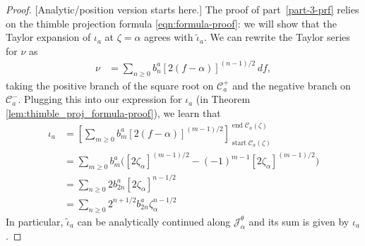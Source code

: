 \documentclass{article}
\newcommand{\series}[1]{\tilde{#1}}
\newcommand{\fracderiv}[3]{\partial^{#1}_{#2, #3}}
\newcommand{\laplace}{\mathcal{L}}
\theoremstyle{definition}
\theoremstyle{plain}
\newenvironment{todo}{\color{Coral}}{\color{black}}
\begin{document}
\begin{proof}
\begin{todo}[Analytic/position version starts here.]\end{todo} The proof of part~\ref{part-3-prf} relies on the thimble projection formula \eqref{eqn:formula-proof}: we will show that the Taylor expansion of $\iota_a$ at $\zeta=\alpha$ agrees with $\series{\iota}_a$. We can rewrite the Taylor series for $\nu$ as
\begin{align*}
\nu & = \sum_{n \ge 0} b_n^a [2(f - \alpha)]^{(n - 1)/2}\,df,
\end{align*}
taking the positive branch of the square root on $\mathcal{C}^+_a$ and the negative branch on $\mathcal{C}^-_a$. Plugging this into our expression for $\iota_a$ (in Theorem \ref{lem:thimble_proj_formula-proof}), we learn that
\begin{align*}
\iota_a & = \left[ \sum_{m \ge 0} b_m^a [2(f - \alpha)]^{(m - 1)/2} \right]_{\operatorname{start} \mathcal{C}_a(\zeta)}^{\operatorname{end} \mathcal{C}_a(\zeta)} \\
& = \sum_{m \ge 0} b_m^a \Big( [2\zeta_\alpha]^{(m - 1)/2} - (-1)^{m-1}[2\zeta_\alpha]^{(m - 1)/2} \Big) \\
& = \sum_{n \ge 0} 2 b_{2n}^a [2\zeta_\alpha]^{n - 1/2} \\
& = \sum_{n \ge 0} 2^{n+1/2} b_{2n}^a \zeta_\alpha^{n - 1/2}
\end{align*}
In particular, $\series{\iota}_a$ can be analytically continued along $\mathcal{J}_\alpha^\theta$ and its sum is given by $\iota_a$. %


\end{proof}
\end{document}
